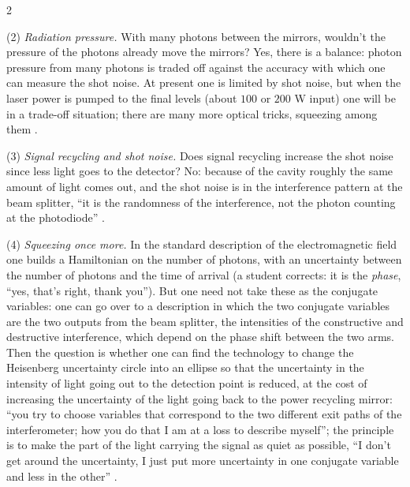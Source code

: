 \begin{paracol}{2}
\begin{coursenote}
(2) \emph{Radiation pressure.} With many photons between the mirrors, wouldn't the pressure of the photons already move the mirrors? Yes, there is a balance: photon pressure from many photons is traded off against the accuracy with which one can measure the shot noise. At present one is limited by shot noise, but when the laser power is pumped to the final levels (about $100$ or $200$ W input) one will be in a trade-off situation; there are many more optical tricks, squeezing among them .

(3) \emph{Signal recycling and shot noise.} Does signal recycling increase the shot noise since less light goes to the detector? No: because of the cavity roughly the same amount of light comes out, and the shot noise is in the interference pattern at the beam splitter, ``it is the randomness of the interference, not the photon counting at the photodiode'' .

(4) \emph{Squeezing once more.} In the standard description of the electromagnetic field one builds a Hamiltonian on the number of photons, with an uncertainty between the number of photons and the time of arrival (a student corrects: it is the \emph{phase}, ``yes, that's right, thank you''). But one need not take these as the conjugate variables: one can go over to a description in which the two conjugate variables are the two outputs from the beam splitter, the intensities of the constructive and destructive interference, which depend on the phase shift between the two arms. Then the question is whether one can find the technology to change the Heisenberg uncertainty circle into an ellipse so that the uncertainty in the intensity of light going out to the detection point is reduced, at the cost of increasing the uncertainty of the light going back to the power recycling mirror: ``you try to choose variables that correspond to the two different exit paths of the interferometer; how you do that I am at a loss to describe myself''; the principle is to make the part of the light carrying the signal as quiet as possible, ``I don't get around the uncertainty, I just put more uncertainty in one conjugate variable and less in the other'' .


\end{coursenote}
\end{paracol}
